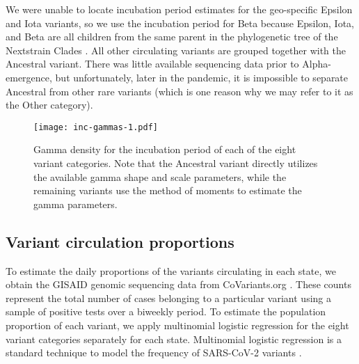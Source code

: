 We were unable to locate incubation period estimates for the geo-specific
Epsilon and Iota variants, so we use the incubation period for Beta because
Epsilon, Iota, and Beta are all children from the same parent in the
phylogenetic tree of the Nextstrain Clades \citep{hodcroft2021covariants}. All
other circulating variants are grouped together with the Ancestral variant.
There was little available sequencing data prior to Alpha-emergence, but
unfortunately, later in the pandemic, it is impossible to separate Ancestral
from other rare variants (which is one reason why we may refer to it as the Other category).

\begin{figure}[!tb]
\centering
    \texttt{[image: inc-gammas-1.pdf]}
    \caption{Gamma density for the incubation period of each of the eight
    variant categories. Note that the Ancestral variant directly utilizes the
    available gamma shape and scale parameters, while the remaining variants use
    the method of moments to estimate the gamma parameters.}
    \label{fig:inc_gammas}
\end{figure}

\subsection{Variant circulation proportions}
\label{sec:variant-proportions}

To estimate the daily proportions of the variants circulating in each state, we
obtain the GISAID genomic sequencing data from CoVariants.org
\citep{hodcroft2021covariants, elbe2017data}. These counts represent the total
number of cases belonging to a particular variant using
a sample of positive tests over a biweekly period. To estimate the population
proportion of each variant, we apply multinomial logistic regression 
for the eight variant categories separately for each state. 
Multinomial logistic regression is a standard technique to model the
frequency of SARS-CoV-2 variants 
\citep{obermeyer2022analysis, annavajhala2021emergence, figgins2021sars}.

